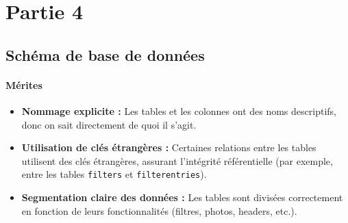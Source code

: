 \section{Partie 4}

\subsection{Schéma de base de données}

\paragraph{Mérites}
\begin{itemize}
    \item \textbf{Nommage explicite :} Les tables et les colonnes ont des noms descriptifs, donc on sait directement de quoi il s’agit.
    \item \textbf{Utilisation de clés étrangères :} Certaines relations entre les tables utilisent des clés étrangères, assurant l’intégrité référentielle (par exemple, entre les tables \texttt{filters} et \texttt{filterentries}).
    \item \textbf{Segmentation claire des données :} Les tables sont divisées correctement en fonction de leurs fonctionnalités (filtres, photos, headers, etc.).
\end{itemize}

